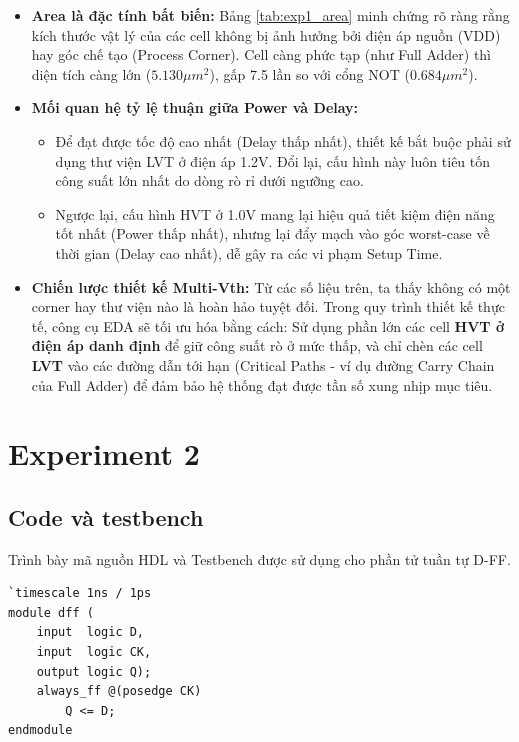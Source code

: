 \documentclass[12pt, a4paper, oneside]{article}
\begin{document}
\begin{itemize}
    \item \textbf{Area là đặc tính bất biến:} Bảng \ref{tab:exp1_area} minh chứng rõ ràng rằng kích thước vật lý của các cell không bị ảnh hưởng bởi điện áp nguồn (VDD) hay góc chế tạo (Process Corner). Cell càng phức tạp (như Full Adder) thì diện tích càng lớn ($5.130 \mu m^2$), gấp 7.5 lần so với cổng NOT ($0.684 \mu m^2$).
    \item \textbf{Mối quan hệ tỷ lệ thuận giữa Power và Delay:} 
    \begin{itemize}
        \item Để đạt được tốc độ cao nhất (Delay thấp nhất), thiết kế bắt buộc phải sử dụng thư viện LVT ở điện áp 1.2V. Đổi lại, cấu hình này luôn tiêu tốn công suất lớn nhất do dòng rò rỉ dưới ngưỡng cao.
        \item Ngược lại, cấu hình HVT ở 1.0V mang lại hiệu quả tiết kiệm điện năng tốt nhất (Power thấp nhất), nhưng lại đẩy mạch vào góc worst-case về thời gian (Delay cao nhất), dễ gây ra các vi phạm Setup Time.
    \end{itemize}
    \item \textbf{Chiến lược thiết kế Multi-Vth:} Từ các số liệu trên, ta thấy không có một corner hay thư viện nào là hoàn hảo tuyệt đối. Trong quy trình thiết kế thực tế, công cụ EDA sẽ tối ưu hóa bằng cách: Sử dụng phần lớn các cell \textbf{HVT ở điện áp danh định} để giữ công suất rò ở mức thấp, và chỉ chèn các cell \textbf{LVT} vào các đường dẫn tới hạn (Critical Paths - ví dụ đường Carry Chain của Full Adder) để đảm bảo hệ thống đạt được tần số xung nhịp mục tiêu.
\end{itemize}


\newpage
\section{Experiment 2}

\subsection{Code và testbench}

Trình bày mã nguồn HDL và Testbench được sử dụng cho phần tử tuần tự D-FF.

\begin{lstlisting}[style={prettyverilog}, caption={code thiết kế D-FF}]
`timescale 1ns / 1ps
module dff (
    input  logic D,
    input  logic CK,
    output logic Q);
    always_ff @(posedge CK)
        Q <= D;
endmodule
\end{lstlisting}
\end{document}
